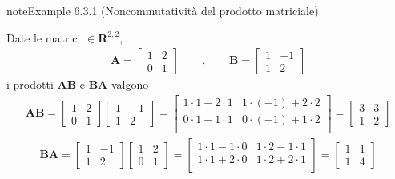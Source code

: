 \documentclass[letterpaper,10pt,italian]{jupyterBook}
\begin{document}
\begin{sphinxadmonition}{note}{Example 6.3.1 (Non\sphinxhyphen{}commutatività del prodotto matriciale)}



\sphinxAtStartPar
Date le matrici \(\in \mathbf{R}^{2,2}\),
\begin{equation*}
\begin{split}
\mathbf{A} = \begin{bmatrix} 1 & 2 \\ 0 & 1 \end{bmatrix} \qquad , \qquad
\mathbf{B} = \begin{bmatrix} 1 &-1 \\ 1 & 2 \end{bmatrix} 
\end{split}
\end{equation*}
\sphinxAtStartPar
i prodotti \(\mathbf{A}\mathbf{B}\) e \(\mathbf{B} \mathbf{A}\) valgono
\begin{equation*}
\begin{split}
\mathbf{A} \mathbf{B}
 = \begin{bmatrix} 1 & 2 \\ 0 & 1 \end{bmatrix} \begin{bmatrix} 1 &-1 \\ 1 & 2 \end{bmatrix} 
 = \begin{bmatrix}
 1 \cdot 1 + 2 \cdot 1 & 1 \cdot (-1) + 2 \cdot 2 \\
 0 \cdot 1 + 1 \cdot 1 & 0 \cdot (-1) + 1 \cdot 2 \\
 \end{bmatrix} =
 \begin{bmatrix}  3 & 3 \\  1 & 2 \end{bmatrix}
\end{split}
\end{equation*}\begin{equation*}
\begin{split}
\mathbf{B}\mathbf{A} 
 = \begin{bmatrix} 1 &-1 \\ 1 & 2 \end{bmatrix}  \begin{bmatrix} 1 & 2 \\ 0 & 1 \end{bmatrix}
 = \begin{bmatrix}
 1 \cdot 1 - 1 \cdot 0 & 1 \cdot 2 - 1 \cdot 1 \\
 1 \cdot 1 + 2 \cdot 0 & 1 \cdot 2 + 2 \cdot 1 \\
 \end{bmatrix} =
 \begin{bmatrix}  1 & 1 \\  1 & 4 \end{bmatrix}
\end{split}
\end{equation*}\end{sphinxadmonition}
\end{document}
